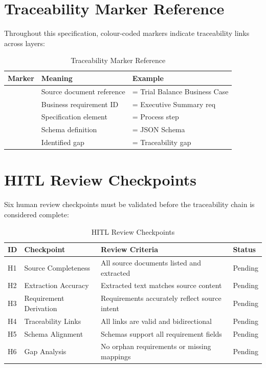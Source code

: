 \section{Traceability Marker Reference}
\label{sec:marker-reference}

Throughout this specification, colour-coded markers indicate
traceability links across layers:

\begin{table}[h]
\centering
\caption{Traceability Marker Reference}
\label{tab:marker-reference}
\begin{tabularx}{\textwidth}{@{}C{3cm}L{5cm}L{6cm}@{}}
\toprule
\textbf{Marker} & \textbf{Meaning} & \textbf{Example} \\
\midrule
{} & Source document reference &  = Trial Balance Business Case \\
 & Business requirement ID &  = Executive Summary req \\
 & Specification element &  = Process step \\
 & Schema definition &  = JSON Schema \\
 & Identified gap &  = Traceability gap \\
\bottomrule
\end{tabularx}
\end{table}

\section{HITL Review Checkpoints}
\label{sec:review-checkpoints}

Six human review checkpoints must be validated before the traceability
chain is considered complete:

\begin{table}[h]
\centering
\caption{HITL Review Checkpoints}
\label{tab:review-checkpoints}
\begin{tabularx}{\textwidth}{@{}C{1cm}L{4cm}L{7cm}C{2cm}@{}}
\toprule
\textbf{ID} & \textbf{Checkpoint} & \textbf{Review Criteria} & \textbf{Status} \\
\midrule
H1 & Source Completeness & All source documents listed and extracted & Pending \\
H2 & Extraction Accuracy & Extracted text matches source content & Pending \\
H3 & Requirement Derivation & Requirements accurately reflect source intent & Pending \\
H4 & Traceability Links & All links are valid and bidirectional & Pending \\
H5 & Schema Alignment & Schemas support all requirement fields & Pending \\
H6 & Gap Analysis & No orphan requirements or missing mappings & Pending \\
\bottomrule
\end{tabularx}
\end{table}

